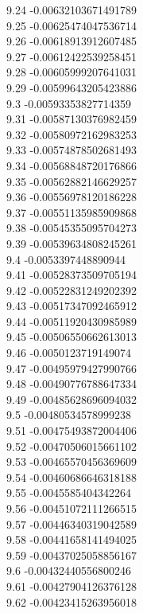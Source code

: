 {9.24	-0.00632103671491789\\
9.25	-0.00625474047536714\\
9.26	-0.00618913912607485\\
9.27	-0.00612422539258451\\
9.28	-0.00605999207641031\\
9.29	-0.00599643205423886\\
9.3	-0.00593353827714359\\
9.31	-0.00587130376982459\\
9.32	-0.00580972162983253\\
9.33	-0.00574878502681493\\
9.34	-0.00568848720176866\\
9.35	-0.00562882146629257\\
9.36	-0.00556978120186228\\
9.37	-0.00551135985909868\\
9.38	-0.00545355095704273\\
9.39	-0.00539634808245261\\
9.4	-0.0053397448890944\\
9.41	-0.00528373509705194\\
9.42	-0.00522831249202392\\
9.43	-0.00517347092465912\\
9.44	-0.00511920430985989\\
9.45	-0.00506550662613013\\
9.46	-0.0050123719149074\\
9.47	-0.00495979427990766\\
9.48	-0.00490776788647334\\
9.49	-0.00485628696094032\\
9.5	-0.00480534578999238\\
9.51	-0.00475493872004406\\
9.52	-0.00470506015661102\\
9.53	-0.00465570456369609\\
9.54	-0.00460686646318188\\
9.55	-0.0045585404342264\\
9.56	-0.00451072111266515\\
9.57	-0.00446340319042589\\
9.58	-0.00441658141494025\\
9.59	-0.00437025058856167\\
9.6	-0.00432440556800246\\
9.61	-0.00427904126376128\\
9.62	-0.00423415263956018\\
}
